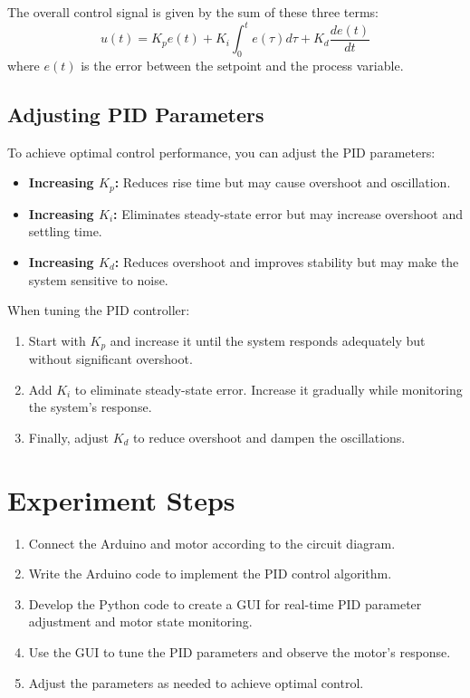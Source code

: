 \documentclass{article}
\begin{document}
The overall control signal is given by the sum of these three terms:
\[ u(t) = K_p e(t) + K_i \int_0^t e(\tau) d\tau + K_d \frac{de(t)}{dt} \]
where \( e(t) \) is the error between the setpoint and the process variable.

\subsection{Adjusting PID Parameters}
To achieve optimal control performance, you can adjust the PID parameters:
\begin{itemize}
    \item \textbf{Increasing $K_p$:} Reduces rise time but may cause overshoot and oscillation.
    \item \textbf{Increasing $K_i$:} Eliminates steady-state error but may increase overshoot and settling time.
    \item \textbf{Increasing $K_d$:} Reduces overshoot and improves stability but may make the system sensitive to noise.
\end{itemize}

When tuning the PID controller:
\begin{enumerate}
    \item Start with $K_p$ and increase it until the system responds adequately but without significant overshoot.
    \item Add $K_i$ to eliminate steady-state error. Increase it gradually while monitoring the system's response.
    \item Finally, adjust $K_d$ to reduce overshoot and dampen the oscillations.
\end{enumerate}

\section{Experiment Steps}
\begin{enumerate}
    \item Connect the Arduino and motor according to the circuit diagram.
    \item Write the Arduino code to implement the PID control algorithm.
    \item Develop the Python code to create a GUI for real-time PID parameter adjustment and motor state monitoring.
    \item Use the GUI to tune the PID parameters and observe the motor's response.
    \item Adjust the parameters as needed to achieve optimal control.
\end{enumerate}
\end{document}
